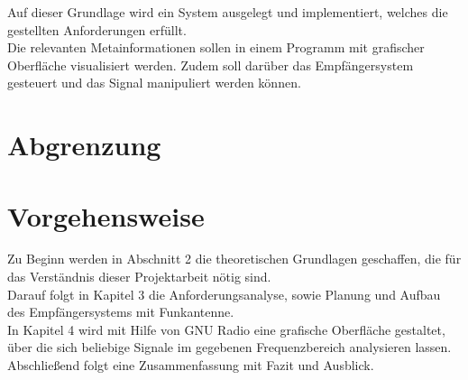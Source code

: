 Auf dieser Grundlage wird ein System ausgelegt und implementiert, welches die gestellten Anforderungen erfüllt.\\

Die relevanten Metainformationen sollen in einem Programm mit grafischer Oberfläche visualisiert werden. Zudem soll darüber das Empfängersystem gesteuert und das Signal manipuliert werden können.





\section{Abgrenzung}


\section{Vorgehensweise}
Zu Beginn werden in Abschnitt 2 die theoretischen Grundlagen geschaffen, die für das Verständnis dieser Projektarbeit nötig sind. \\
Darauf folgt in Kapitel 3 die Anforderungsanalyse, sowie Planung und Aufbau des Empfängersystems mit Funkantenne.\\
In Kapitel 4 wird mit Hilfe von GNU Radio eine grafische Oberfläche gestaltet, über die sich beliebige Signale im gegebenen Frequenzbereich analysieren lassen.\\
Abschließend folgt eine Zusammenfassung mit Fazit und Ausblick.










